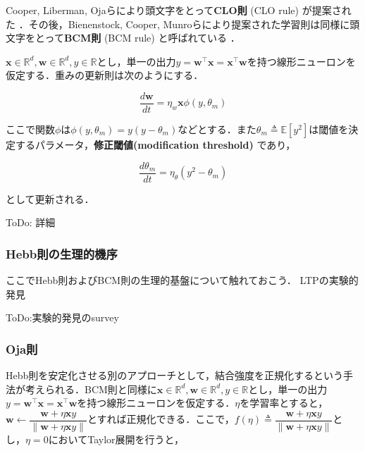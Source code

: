 Cooper, Liberman, Ojaらにより頭文字をとって\textbf{CLO則} (CLO rule) が提案された \cite{Cooper1979-wz}．その後，Bienenstock, Cooper, Munroらにより提案された学習則は同様に頭文字をとって\textbf{BCM則} (BCM rule) と呼ばれている\cite{Bienenstock1982-km} \cite{Cooper2012-ec}．

$\mathbf{x}\in \mathbb{R}^d, \mathbf{w}\in \mathbb{R}^d, y\in \mathbb{R}$とし，単一の出力$y = \mathbf{w}^\top \mathbf{x}=\mathbf{x}^\top \mathbf{w}$を持つ線形ニューロンを仮定する．重みの更新則は次のようにする．


\begin{equation}
\frac{d\mathbf{w}}{dt} = \eta_w \mathbf{x} \phi(y, \theta_m)
\end{equation}


ここで関数$\phi$は$\phi(y, \theta_m)=y(y-\theta_m)$などとする．また$\theta_m\triangleq\mathbb{E}[y^2]$は閾値を決定するパラメータ，\textbf{修正閾値(modification threshold)} であり，


\begin{equation}
\frac{d\theta_m}{dt} = \eta_{\theta} \left(y^2-\theta_m\right)
\end{equation}


として更新される．

ToDo: 詳細




\subsubsection{Hebb則の生理的機序}
ここでHebb則およびBCM則の生理的基盤について触れておこう．
LTPの実験的発見 \cite{Bliss1973-vj} \cite{Dudek1992-nz}

ToDo:実験的発見のsurvey
\subsubsection{Oja則}
Hebb則を安定化させる別のアプローチとして，結合強度を正規化するという手法が考えられる．BCM則と同様に$\mathbf{x}\in \mathbb{R}^d, \mathbf{w}\in \mathbb{R}^d, y\in \mathbb{R}$とし，単一の出力$y = \mathbf{w}^\top \mathbf{x}=\mathbf{x}^\top \mathbf{w}$を持つ線形ニューロンを仮定する．$\eta$を学習率とすると，$\mathbf{w}\leftarrow\dfrac{\mathbf{w}+\eta \mathbf{x}y}{\|\mathbf{w}+\eta \mathbf{x}y\|}$とすれば正規化できる．ここで，$f(\eta)\triangleq\dfrac{\mathbf{w}+\eta \mathbf{x}y}{\|\mathbf{w}+\eta \mathbf{x}y\|}$とし，$\eta=0$においてTaylor展開を行うと，



